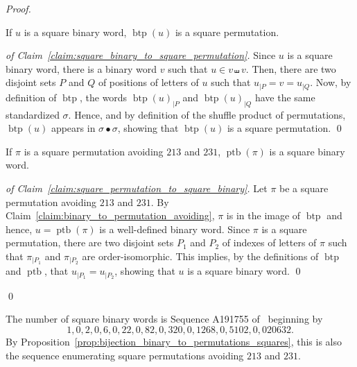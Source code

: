 \documentclass[a4paper]{llncs}
\DeclareMathOperator{\SHUFFLE}{\bullet}
\DeclareMathOperator{\BINTOPERM}{\mathrm{btp}}
\DeclareMathOperator{\PERMTOBIN}{\mathrm{ptb}}
\begin{document}
\begin{proof}
    \begin{claim} \label{claim:square_binary_to_square_permutation}
        If $u$ is a square binary word, $\BINTOPERM(u)$ is a square
        permutation.
    \end{claim}
    \begin{proof}[of Claim~\ref{claim:square_binary_to_square_permutation}]
        Since $u$ is a square binary word, there is a binary word $v$
        such that $u \in v \shuffle v$. Then, there are two disjoint
        sets $P$ and $Q$ of positions of letters of $u$ such that
        $u_{|P} = v = u_{|Q}$. Now, by definition of $\BINTOPERM$, the
        words $\BINTOPERM(u)_{|P}$ and $\BINTOPERM(u)_{|Q}$ have the
        same standardized $\sigma$. Hence, and by definition of
        the shuffle product of permutations, $\BINTOPERM(u)$ appears in
        $\sigma \SHUFFLE \sigma$, showing that $\BINTOPERM(u)$ is a
        square permutation.
        \qed
    \end{proof}

    \begin{claim} \label{claim:square_permutation_to_square_binary}
        If $\pi$ is a square permutation avoiding $213$ and $231$,
        $\PERMTOBIN(\pi)$ is a square binary word.
    \end{claim}
    \begin{proof}[of Claim~\ref{claim:square_permutation_to_square_binary}]
        Let $\pi$ be a square permutation avoiding $213$ and $231$. By
        Claim~\ref{claim:binary_to_permutation_avoiding}, $\pi$ is in
        the image of $\BINTOPERM$ and hence, $u = \PERMTOBIN(\pi)$ is a
        well-defined binary word. Since $\pi$ is a square permutation,
        there are two disjoint sets $P_1$ and $P_2$ of indexes of letters
        of $\pi$ such that $\pi_{|P_1}$ and $\pi_{|P_2}$ are
        order-isomorphic. This implies, by the definitions of $\BINTOPERM$
        and $\PERMTOBIN$, that $u_{|P_1} = u_{|P_2}$, showing that $u$
        is a square binary word.
        \qed
    \end{proof}
    \qed
\end{proof}

The number of square binary words is Sequence A191755 of~\cite{Slo}
beginning by
\begin{equation}
1, 0, 2, 0, 6, 0, 22, 0, 82, 0, 320, 0, 1268, 0, 5102, 0, 020632.
\end{equation}
By Proposition~\ref{prop:bijection_binary_to_permutations_squares}, this
is also the sequence enumerating square permutations avoiding $213$
and $231$.
\end{document}
